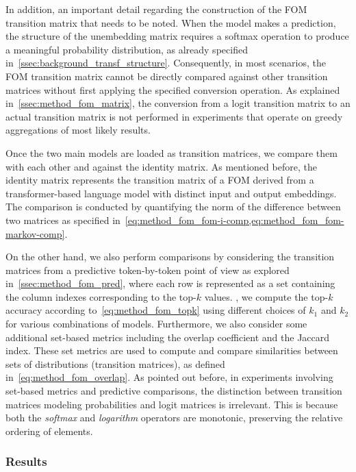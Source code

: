 In addition, an important detail regarding the construction of the FOM transition matrix that needs to be noted.
When the model makes a prediction, the structure of the unembedding matrix requires a softmax operation to produce a meaningful probability distribution, as already specified in~\cref{ssec:background_transf_structure}.
Consequently, in most scenarios, the FOM transition matrix cannot be directly compared against other transition matrices without first applying the specified conversion operation.
As explained in~\cref{ssec:method_fom_matrix}, the conversion from a logit transition matrix to an actual transition matrix is not performed in experiments that operate on greedy aggregations of most likely results.

Once the two main models are loaded as transition matrices, we compare them with each other and against the identity matrix.
As mentioned before, the identity matrix represents the transition matrix of a FOM derived from a transformer-based language model with distinct input and output embeddings.
The comparison is conducted by quantifying the norm of the difference between two matrices as specified in~\cref{eq:method_fom_fom-i-comp,eq:method_fom_fom-markov-comp}.

On the other hand, we also perform comparisons by considering the transition matrices from a predictive token-by-token point of view as explored in~\cref{ssec:method_fom_pred}, where each row is represented as a set containing the column indexes corresponding to the top-$k$ values.
, we compute the top-$k$ accuracy according to~\cref{eq:method_fom_topk} using different choices of $k_1$ and $k_2$ for various combinations of models.
Furthermore, we also consider some additional set-based metrics including the overlap coefficient and the Jaccard index.
These set metrics are used to compute and compare similarities between sets of distributions (transition matrices), as defined in~\cref{eq:method_fom_overlap}.
As pointed out before, in experiments involving set-based metrics and predictive comparisons, the distinction between transition matrices modeling probabilities and logit matrices is irrelevant.
This is because both the \emph{softmax} and \emph{logarithm} operators are monotonic, preserving the relative ordering of elements.

\subsubsection{Results}\label{sssec:exp_fom_exp1_results}

